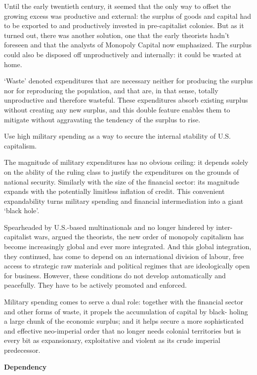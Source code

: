 \documentclass[
]{book}
\begin{document}
Until the early twentieth century, it seemed that the only way to offset the growing excess
was productive and external: the surplus of goods and capital had to be exported to and
productively invested in pre-capitalist colonies. But as it turned out, there was another
solution, one that the early theorists hadn't foreseen and that the analysts of Monopoly
Capital now emphasized. The surplus could also be disposed off unproductively and
internally: it could be wasted at home.

`Waste' denoted expenditures that are
necessary neither for producing the surplus nor for reproducing the population, and that
are, in that sense, totally unproductive and therefore wasteful. These expenditures absorb
existing surplus without creating any new surplus, and this double feature enables them to
mitigate without aggravating the tendency of the surplus to rise.

Use high military spending as a way to
secure the internal stability of U.S. capitalism.

The magnitude of military expenditures has no obvious ceiling: it
depends solely on the ability of the ruling class to justify the expenditures on the grounds
of national security. Similarly with the size of the financial sector: its magnitude expands
with the potentially limitless inflation of credit. This convenient expandability turns
military spending and financial intermediation into a giant `black hole'.

Spearheaded by U.S.-based multinationals and no longer hindered by inter-
capitalist wars, argued the theorists, the new order of monopoly capitalism has become
increasingly global and ever more integrated. And this global integration, they continued,
has come to depend on an international division of labour, free access to strategic raw
materials and political regimes that are ideologically open for business. However, these
conditions do not develop automatically and peacefully. They have to be actively
promoted and enforced.

Military spending comes to serve a dual role: together with the
financial sector and other forms of waste, it propels the accumulation of capital by black-
holing a large chunk of the economic surplus; and it helps secure a more sophisticated
and effective neo-imperial order that no longer needs colonial territories but is every bit
as expansionary, exploitative and violent as its crude imperial predecessor.

\textbf{Dependency}
\end{document}
